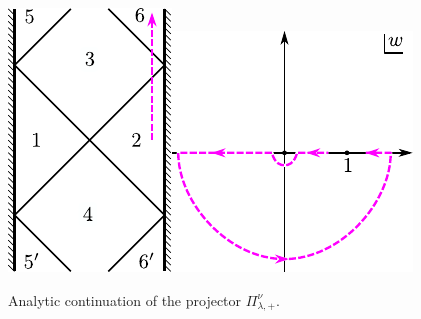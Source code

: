 \documentclass[12pt]{article}
\begin{document}
\begin{figure}
\centerline{
\includegraphics{anacon_a}\hspace{2cm}\includegraphics{anacon_b}
}
\caption{Analytic continuation of the projector $\Pi^{\nu}_{\lambda,+}$.}
\label{fig_anacon}
\end{figure}
\end{document}

